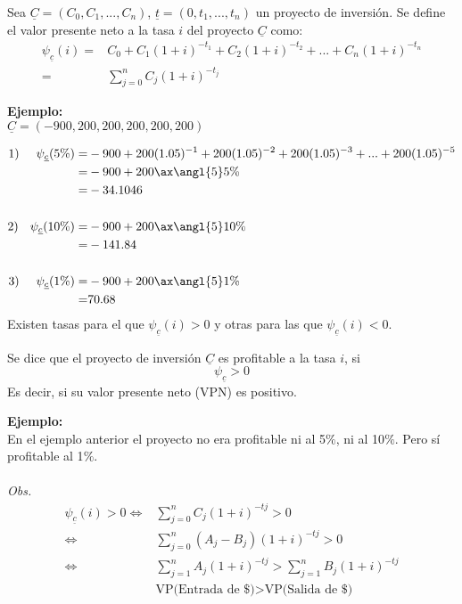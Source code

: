 \begin{definition}
Sea $\underline{C}=(C_0,C_1,...,C_n)$, $\underline{t}= (0,t_1,...,t_n)$ un proyecto de inversión. Se define el valor presente neto a la tasa $i$ del proyecto $\underline{C}$ como:
\begin{align*}
    \psi_{\underline{c}}(i)=& C_0 + C_1(1+i)^{-t_1}+C_2(1+i)^{-t_2}+...+C_n(1+i)^{-t_n}\\
    =& \sum_{j=0}^{n}C_j(1+i)^{-t_j}
\end{align*}
\end{definition}
\textbf{Ejemplo:}\\
$\underline{C}= (-900,200,200,200,200,200)$

    \begin{align*}
      1)\phantom{abc} \psi_{\underline{c}}(5\%) =& -900+200(1.05)^{-1}+200(1.05)^{-2}+200(1.05)^{-3}+...+200(1.05)^{-5}\\
        =& -900+ 200\ax{\angl{5}5\%}\\ %
        =& -34.1046 \\ \\
      2)\phantom{ab} \psi_{\underline{c}}(10\%) =& -900 +200 \ax{\angl{5}10\%}\\
        =& -141.84 \\ \\
      3) \phantom{abc} \psi_{\underline{c}}(1\%) =& -900+200 \ax{\angl{5}1\%}\\
      = & 70.68
    \end{align*}
Existen tasas para el que $\psi_{\underline{c}}(i)>0$ y otras para las que $\psi_{\underline{c}}(i)<0$.\\
\begin{definition}
Se dice que el proyecto de inversión $\underline{C}$ es profitable a la tasa $i$, si 
$$\psi_{\underline{c}}>0$$ 
Es decir, si su valor presente neto (VPN) es positivo.
\end{definition}
\textbf{Ejemplo:}\\
En el ejemplo anterior el proyecto no era profitable ni al 5$\%$, ni al 10$\%$. Pero sí profitable al 1$\%$.\\ \\
\textit{Obs.}
\begin{align*}
    \psi_{\underline{c}}(i) > 0 \Leftrightarrow & \sum_{j=0}^{n}C_j(1+i)^{-tj} > 0\\
    \Leftrightarrow & \sum_{j=0}^{n}(A_j-B_j)(1+i)^{-tj}>0\\
    \Leftrightarrow & \sum_{j=1}^{n}A_j(1+i)^{-tj}>\sum_{j=1}^{n}B_j(1+i)^{-tj}\\
    & \text{VP(Entrada de \$)} > \text{VP(Salida de \$)}
\end{align*}
